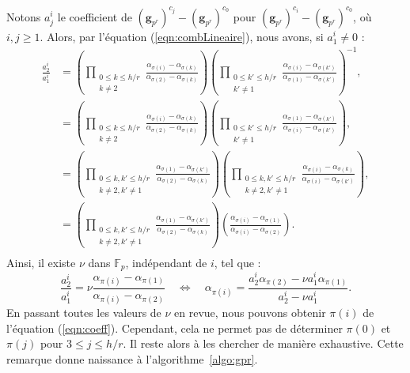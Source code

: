 \documentclass[a4paper, titlepage, 11pt]{article}
\theoremstyle{definition}
\theoremstyle{remark}
\def\gf #1{\mathbb{F}_{#1}}
\def\mbf #1{\mathbf{#1}}
\begin{document}
Notons $a_j^i$ le coefficient de $(\mbf g_{p^r})^{c_{{j}}} - (\mbf g_{p^r})^{c_{0}}$ pour $(\mbf g_{p^r})^{c_{i}} - (\mbf g_{p^r})^{c_{0}}$, où $i , j\geqslant 1$. Alors, par l'équation (\ref{eqn:combLineaire}), nous avons, si $a_1^i \neq 0$ :
\begin{align*}
\frac{a_2^i}{a_1^i} &= \left(\prod_{\substack{0\leqslant k\leqslant h/r \\ k \neq 2}} \frac{\alpha_{\sigma(i)}-\alpha_{\sigma(k)}}{\alpha_{\sigma(2)}-\alpha_{\sigma(k)}} \right)\left(\prod_{\substack{0\leqslant k'\leqslant h/r \\ k' \neq 1}} \frac{\alpha_{\sigma(i)}-\alpha_{\sigma({k'})}}{\alpha_{\sigma(1)}-\alpha_{\sigma({k'})}} \right)^{-1}, \\
&= \left(\prod_{\substack{0\leqslant k\leqslant h/r \\ k \neq 2}} \frac{\alpha_{\sigma(i)}-\alpha_{\sigma(k)}}{\alpha_{\sigma(2)}-\alpha_{\sigma(k)}} \right)\left(\prod_{\substack{0\leqslant k' \leqslant h/r \\ k' \neq 1}} \frac{\alpha_{\sigma(1)}-\alpha_{\sigma({k'})}}{\alpha_{\sigma(i)}-\alpha_{\sigma({k'})}} \right), \\
&= \left(\prod_{\substack{0\leqslant k, k'\leqslant h/r \\ k \neq 2, k' \neq 1}} \frac{\alpha_{\sigma(1)}-\alpha_{\sigma({k'})}}{\alpha_{\sigma(2)}-\alpha_{\sigma(k)}} \right) \left(\prod_{\substack{0\leqslant k, k'\leqslant h/r \\ k \neq 2, k' \neq 1}} \frac{\alpha_{\sigma(i)}-\alpha_{\sigma(k)}}{\alpha_{\sigma(i)}-\alpha_{\sigma({k'})}} \right), \\
&= \left(\prod_{\substack{0\leqslant k, k'\leqslant h/r \\ k \neq 2, k' \neq 1}} \frac{\alpha_{\sigma(1)}-\alpha_{\sigma({k'})}}{\alpha_{\sigma(2)}-\alpha_{\sigma(k)}} \right) \left(\frac{\alpha_{\sigma(i)}-\alpha_{\sigma(1)}}{\alpha_{\sigma(i)}-\alpha_{\sigma(2)}} \right). \\
\end{align*}
Ainsi, il existe $\nu$ dans $\gf{p}$, indépendant de $i$, tel que :
\begin{equation}\label{eqn:coeff}
\frac{a_2^i}{a_1^i} = \nu \frac{\alpha_{\pi(i)}-\alpha_{\pi(1)}}{\alpha_{\pi(i)}-\alpha_{\pi(2)}}\quad\Leftrightarrow\quad
\alpha_{\pi(i)} = \frac{a_2^i\alpha_{\pi(2)}-\nu a_1^i\alpha_{\pi(1)}}{a_2^i-\nu a_1^i}.
\end{equation}
En passant toutes les valeurs de $\nu$ en revue, nous pouvons obtenir $\pi(i)$ de l'équation (\ref{eqn:coeff}). Cependant, cela ne permet pas de déterminer $\pi(0)$ et $\pi(j)$ pour $3 \leqslant j \leqslant h/r$. Il reste alors à les chercher de manière exhaustive. Cette remarque donne naissance à l'algorithme~\ref{algo:gpr}.
\end{document}
